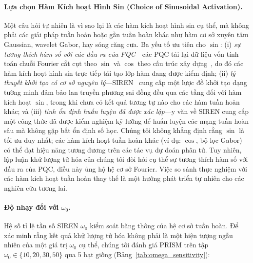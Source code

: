 \documentclass[10pt,twocolumn,letterpaper]{article}
\begin{document}
\paragraph{Lựa chọn Hàm Kích hoạt Hình Sin (Choice of Sinusoidal Activation).}
Một câu hỏi tự nhiên là vì sao lại là các hàm kích hoạt hình sin cụ thể, mà không phải các giải pháp tuần hoàn hoặc gần tuần hoàn khác như hàm cơ sở xuyên tâm Gaussian, wavelet Gabor, hay sóng răng cưa. Ba yếu tố ưu tiên cho $\sin$: (i) \textit{sự tương thích hàm số với các đầu ra của PQC}---các PQC tải lại dữ liệu vốn tính toán chuỗi Fourier cắt cụt theo $\sin$ và $\cos$ theo cấu trúc xây dựng~\cite{Schuld:2020enb}, do đó các hàm kích hoạt hình sin trực tiếp tái tạo lớp hàm đang được kiểm định; (ii) \textit{lý thuyết khởi tạo có cơ sở nguyên lý}---SIREN~\cite{sitzmann2020siren} cung cấp một lược đồ khởi tạo dạng tường minh đảm bảo lan truyền phương sai đồng đều qua các tầng đối với hàm kích hoạt $\sin$, trong khi chưa có kết quả tương tự nào cho các hàm tuần hoàn khác; và (iii) \textit{tính ổn định huấn luyện đã được xác lập}---y văn về SIREN cung cấp một công thức đã được kiểm nghiệm kỹ lưỡng để huấn luyện các mạng tuần hoàn sâu mà không gặp bất ổn định số học. Chúng tôi không khẳng định rằng $\sin$ là tối ưu duy nhất; các hàm kích hoạt tuần hoàn khác (ví dụ: $\cos$, bộ lọc Gabor) có thể đạt hiệu năng tương đương trên các tác vụ dự đoán phân tử. Tuy nhiên, lập luận khử lượng tử hóa của chúng tôi đòi hỏi cụ thể sự tương thích hàm số với đầu ra của PQC, điều này ủng hộ hệ cơ sở Fourier. Việc so sánh thực nghiệm với các hàm kích hoạt tuần hoàn thay thế là một hướng phát triển tự nhiên cho các nghiên cứu tương lai.

\paragraph{Độ nhạy đối với $\omega_0$.}
Hệ số tỉ lệ tần số SIREN $\omega_0$ kiểm soát băng thông của hệ cơ sở tuần hoàn. Để xác minh rằng kết quả khử lượng tử hóa không phải là một hiện tượng ngẫu nhiên của một giá trị $\omega_0$ cụ thể, chúng tôi đánh giá PRISM trên tập $\omega_0 \in \{10, 20, 30, 50\}$ qua 5 hạt giống (Bảng~\ref{tab:omega_sensitivity}):
\end{document}
